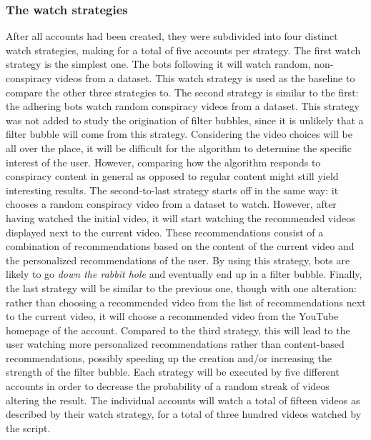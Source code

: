 \documentclass[../main.tex]{subfiles}
\begin{document}
\subsubsection{The watch strategies}
After all accounts had been created, they were subdivided into four distinct watch strategies, making for
a total of five accounts per strategy. The first watch strategy is the simplest one. The bots following 
it will watch random, non-conspiracy videos from a dataset. This watch strategy is used as the 
baseline to compare the other three strategies to. The second strategy is similar to the first: the 
adhering bots watch random conspiracy videos from a dataset. This strategy was not added to 
study the origination of filter bubbles, since it is unlikely that a filter bubble will come from this 
strategy. Considering the video choices will be all over the place, it will be difficult for the 
algorithm to determine the specific interest of the user. However, comparing how the algorithm 
responds to conspiracy content in general as opposed to regular content might still yield interesting 
results. The second-to-last strategy starts off in the same way: it chooses a random conspiracy video 
from a dataset to watch. However, after having watched the initial video, it will start watching the 
recommended videos displayed next to the current video. These recommendations consist of a combination of
recommendations based on the content of the current video and the personalized recommendations of the 
user. By using this strategy, bots are likely to go \textit{down the rabbit hole} and eventually end up 
in a filter bubble. Finally, the last strategy will be similar to the previous one, though with one 
alteration: rather than choosing a recommended video from the list of recommendations next to the current
video, it will choose a recommended video from the YouTube homepage of the account. Compared to the third
strategy, this will lead to the user watching more personalized recommendations rather than content-based
recommendations, possibly speeding up the creation and/or increasing the strength of the filter bubble. 
Each strategy will be executed by five different accounts in order to decrease the probability of a 
random streak of videos altering the result. The individual accounts will watch a total of fifteen
videos as described by their watch strategy, for a total of three hundred videos watched by the script. 
\end{document}
